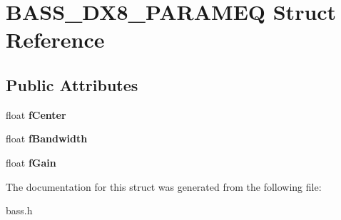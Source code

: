 \hypertarget{structBASS__DX8__PARAMEQ}{}\section{B\+A\+S\+S\+\_\+\+D\+X8\+\_\+\+P\+A\+R\+A\+M\+E\+Q Struct Reference}
\label{structBASS__DX8__PARAMEQ}
\subsection*{Public Attributes}
\begin{DoxyCompactItemize}
\item 
\hypertarget{structBASS__DX8__PARAMEQ_ab0774aabf58f7e8eb28213a710713c4e}{}float {\bfseries f\+Center}\label{structBASS__DX8__PARAMEQ_ab0774aabf58f7e8eb28213a710713c4e}

\item 
\hypertarget{structBASS__DX8__PARAMEQ_a93e4f82cbba760d52f2f3b0703c36b8b}{}float {\bfseries f\+Bandwidth}\label{structBASS__DX8__PARAMEQ_a93e4f82cbba760d52f2f3b0703c36b8b}

\item 
\hypertarget{structBASS__DX8__PARAMEQ_ab573fd8cee48cc9ce5d0c2264bc0394d}{}float {\bfseries f\+Gain}\label{structBASS__DX8__PARAMEQ_ab573fd8cee48cc9ce5d0c2264bc0394d}

\end{DoxyCompactItemize}


The documentation for this struct was generated from the following file\+:\begin{DoxyCompactItemize}
\item 
bass.\+h\end{DoxyCompactItemize}
